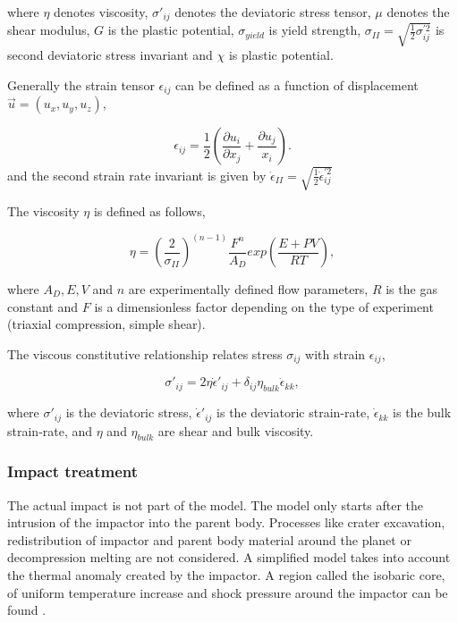 where $\eta$ denotes viscosity, $\sigma'_{ij}$ denotes the deviatoric stress tensor, $\mu$ denotes the shear modulus, $G$ is the plastic potential, $\sigma_{yield}$ is yield strength, $\sigma_{II}=\sqrt{\frac{1}{2}\sigma_{ij}^{'2}}$ is second deviatoric stress invariant and $\chi$ is plastic potential.

Generally the strain tensor $\epsilon_{ij}$ can be defined as a function of displacement $\vec{u} = (u_x, u_y, u_z)$,

\begin{equation}\label{strain}
\epsilon_{ij} = \dfrac{1}{2} \left(\dfrac{\partial u_i}{\partial x_j} + \dfrac{\partial u_j}{x_i}\right).
\end{equation}
and the second strain rate invariant is given by $\dot{\epsilon}_{II} = \sqrt{\frac{1}{2}\dot{\epsilon}_{ij}^{'2}}$

The viscosity $\eta$ is defined as follows,

\begin{equation}
\eta = \left(\dfrac{2}{\sigma_{II}}\right)^{\left(n-1\right)}\dfrac{F^n}{A_D} exp{\left(\dfrac{E + P V}{R T}\right)},
\end{equation}

where $A_D, E, V$ and $n$ are experimentally defined flow parameters, $R$ is the gas constant and $F$ is a dimensionless factor depending on the type of experiment (triaxial compression, simple shear).

The viscous constitutive relationship relates stress $\sigma_{ij}$ with strain $\epsilon_{ij}$,

\begin{equation}
\sigma'_{ij} = 2\eta \dot{\epsilon}'_{ij} + \delta_{ij} \eta_{bulk} \dot{\epsilon}_{kk}, 
\end{equation}

where $\sigma'_{ij}$ is the deviatoric stress, $\dot{\epsilon}'_{ij}$ is the deviatoric strain-rate, $\dot{\epsilon}_{kk}$ is the bulk strain-rate, and $\eta$ and $\eta_{bulk}$ are shear and bulk viscosity.

\subsubsection{Impact treatment}

The actual impact is not part of the model. The model only starts after the intrusion of the impactor into the parent body. Processes like crater excavation, redistribution of impactor and parent body material around the planet or decompression melting are not considered. A simplified model takes into account the thermal anomaly created by the impactor. A region called the isobaric core, of uniform temperature increase and shock pressure around the impactor can be found \citep{Senshu2002}.


